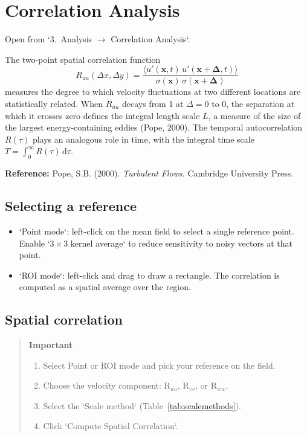 \section{Correlation Analysis}
\label{ch:correlation}

Open from `3.\ Analysis $\to$ Correlation Analysis`.

The two-point spatial correlation function
\[
R_{uu}(\Delta x, \Delta y) = \frac{\langle u'(\mathbf{x}, t)\, u'(\mathbf{x}+\boldsymbol{\Delta}, t) \rangle}{\sigma(\mathbf{x})\,\sigma(\mathbf{x}+\boldsymbol{\Delta})}
\]
measures the degree to which velocity fluctuations at two different locations are statistically related. When $R_{uu}$ decays from 1 at $\Delta = 0$ to 0, the separation at which it crosses zero defines the integral length scale $L$, a measure of the size of the largest energy-containing eddies (Pope, 2000). The temporal autocorrelation $R(\tau)$ plays an analogous role in time, with the integral time scale $T = \int_0^{\infty} R(\tau)\,\mathrm{d}\tau$.

\noindent\textbf{Reference:} Pope, S.B. (2000). \textit{Turbulent Flows}. Cambridge University Press.

\subsection{Selecting a reference}

\begin{itemize}[leftmargin=1.5em]
  \item `Point mode`: left-click on the mean field to select a single reference point. Enable `$3\times3$ kernel average` to reduce sensitivity to noisy vectors at that point.
  \item `ROI mode`: left-click and drag to draw a rectangle. The correlation is computed as a spatial average over the region.
\end{itemize}

\subsection{Spatial correlation}

\begin{quote}
\textbf{Important}
\begin{enumerate}[leftmargin=1.5em, topsep=2pt]
  \item Select Point or ROI mode and pick your reference on the field.
  \item Choose the velocity component: R$_{uu}$, R$_{vv}$, or R$_{ww}$.
  \item Select the `Scale method` (Table~\ref{tab:scalemethods}).
  \item Click `Compute Spatial Correlation`.
\end{enumerate}
\end{quote}


